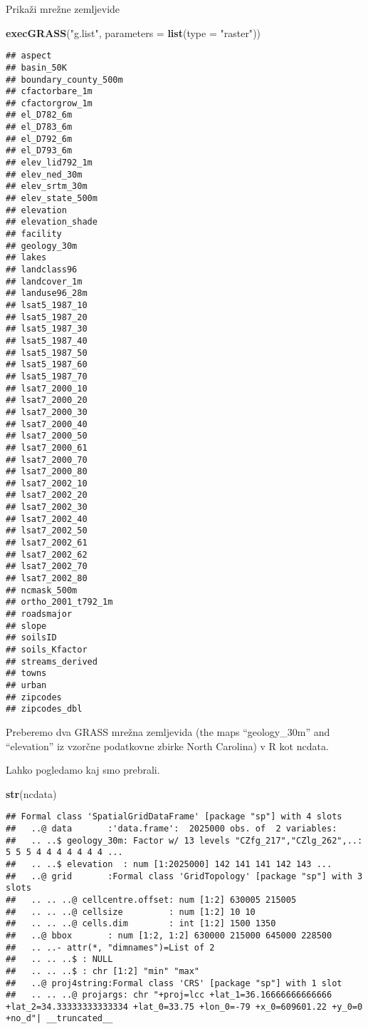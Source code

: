 \documentclass[]{article}
\newenvironment{Shaded}{\begin{snugshade}}{\end{snugshade}}
\newcommand{\KeywordTok}[1]{\textcolor[rgb]{0.13,0.29,0.53}{\textbf{#1}}}
\newcommand{\DataTypeTok}[1]{\textcolor[rgb]{0.13,0.29,0.53}{#1}}
\newcommand{\StringTok}[1]{\textcolor[rgb]{0.31,0.60,0.02}{#1}}
\newcommand{\NormalTok}[1]{#1}
\begin{document}
Prikaži mrežne zemljevide

\begin{Shaded}
\begin{Highlighting}[]
\KeywordTok{execGRASS}\NormalTok{(}\StringTok{"g.list"}\NormalTok{, }\DataTypeTok{parameters =} \KeywordTok{list}\NormalTok{(}\DataTypeTok{type =} \StringTok{"raster"}\NormalTok{))}
\end{Highlighting}
\end{Shaded}

\begin{verbatim}
## aspect
## basin_50K
## boundary_county_500m
## cfactorbare_1m
## cfactorgrow_1m
## el_D782_6m
## el_D783_6m
## el_D792_6m
## el_D793_6m
## elev_lid792_1m
## elev_ned_30m
## elev_srtm_30m
## elev_state_500m
## elevation
## elevation_shade
## facility
## geology_30m
## lakes
## landclass96
## landcover_1m
## landuse96_28m
## lsat5_1987_10
## lsat5_1987_20
## lsat5_1987_30
## lsat5_1987_40
## lsat5_1987_50
## lsat5_1987_60
## lsat5_1987_70
## lsat7_2000_10
## lsat7_2000_20
## lsat7_2000_30
## lsat7_2000_40
## lsat7_2000_50
## lsat7_2000_61
## lsat7_2000_70
## lsat7_2000_80
## lsat7_2002_10
## lsat7_2002_20
## lsat7_2002_30
## lsat7_2002_40
## lsat7_2002_50
## lsat7_2002_61
## lsat7_2002_62
## lsat7_2002_70
## lsat7_2002_80
## ncmask_500m
## ortho_2001_t792_1m
## roadsmajor
## slope
## soilsID
## soils_Kfactor
## streams_derived
## towns
## urban
## zipcodes
## zipcodes_dbl
\end{verbatim}

Preberemo dva GRASS mrežna zemljevida (the maps ``geology\_30m'' and
``elevation'' iz vzorčne podatkovne zbirke North Carolina) v R kot
ncdata.

Lahko pogledamo kaj smo prebrali.

\begin{Shaded}
\begin{Highlighting}[]
\KeywordTok{str}\NormalTok{(ncdata)}
\end{Highlighting}
\end{Shaded}

\begin{verbatim}
## Formal class 'SpatialGridDataFrame' [package "sp"] with 4 slots
##   ..@ data       :'data.frame':  2025000 obs. of  2 variables:
##   .. ..$ geology_30m: Factor w/ 13 levels "CZfg_217","CZlg_262",..: 5 5 5 4 4 4 4 4 4 4 ...
##   .. ..$ elevation  : num [1:2025000] 142 141 141 142 143 ...
##   ..@ grid       :Formal class 'GridTopology' [package "sp"] with 3 slots
##   .. .. ..@ cellcentre.offset: num [1:2] 630005 215005
##   .. .. ..@ cellsize         : num [1:2] 10 10
##   .. .. ..@ cells.dim        : int [1:2] 1500 1350
##   ..@ bbox       : num [1:2, 1:2] 630000 215000 645000 228500
##   .. ..- attr(*, "dimnames")=List of 2
##   .. .. ..$ : NULL
##   .. .. ..$ : chr [1:2] "min" "max"
##   ..@ proj4string:Formal class 'CRS' [package "sp"] with 1 slot
##   .. .. ..@ projargs: chr "+proj=lcc +lat_1=36.16666666666666 +lat_2=34.33333333333334 +lat_0=33.75 +lon_0=-79 +x_0=609601.22 +y_0=0 +no_d"| __truncated__
\end{verbatim}
\end{document}
